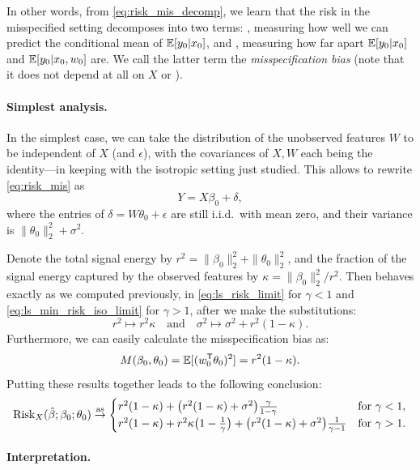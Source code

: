 \documentclass{article}
\begin{document}
In other words, from \eqref{eq:risk_mis_decomp}, we learn that the risk in the
misspecified setting decomposes into two terms: , measuring how well we can predict the conditional mean of
$\mathbb{E}[y_0|x_0]$, and , measuring how far
apart $\mathbb{E}[y_0|x_0]$ and $\mathbb{E}[y_0|x_0,w_0]$ are. We call the latter term the
\emph{misspecification bias} (note that it does not depend at all on $X$ or
\smash{$\hbeta$}).   

\paragraph{Simplest analysis.}

In the simplest case, we can take the distribution of the unobserved features
$W$ to be independent of $X$ (and $\epsilon$), with the covariances of $X,W$
each being the identity---in keeping with the isotropic setting just
studied. This allows to rewrite \eqref{eq:risk_mis} as 
\[
Y = X\beta_0 + \delta,
\]
where the entries of $\delta = W\theta_0 + \epsilon$ are still i.i.d.\ with mean
zero, and their variance is $\|\theta_0\|_2^2 + \sigma^2$. 

Denote the total signal energy by $r^2=\|\beta_0\|_2^2+\|\theta_0\|_2^2$, and
the fraction of the signal energy captured by the observed features by
$\kappa=\|\beta_0\|_2^2 / r^2$. Then 
behaves exactly as we computed previously, in \eqref{eq:ls_risk_limit} for
$\gamma<1$ and \eqref{eq:ls_min_risk_iso_limit} for $\gamma>1$, after we make
the substitutions:    
\[
r^2 \mapsto r^2 \kappa \quad \text{and} \quad
\sigma^2 \mapsto \sigma^2 + r^2 (1-\kappa).
\]
Furthermore, we can easily calculate the misspecification bias as: 
\[
M(\beta_0, \theta_0) = \mathbb{E}[(w_0^{\mathsf{T}} \theta_0)^2] = r^2 (1-\kappa). 
\]
Putting these results together leads to the following conclusion:
\begin{equation}
\label{eq:ls_min_risk_iso_mis_limit}
\mathrm{Risk}_X(\hat{\beta}; \beta_0; \theta_0) \overset{\mathrm{as}}{\to} 
\begin{cases}
r^2(1-\kappa) + \big(r^2(1-\kappa) + \sigma^2\big) 
\frac{\gamma}{1-\gamma} & \text{for $\gamma < 1$}, \\
r^2(1-\kappa) + r^2 \kappa \big(1-\frac{1}{\gamma}\big) 
+ \big(r^2(1-\kappa) + \sigma^2\big) \frac{1}{\gamma-1} &  
\text{for $\gamma > 1$}.
\end{cases}
\end{equation}

\paragraph{Interpretation.}
\end{document}
